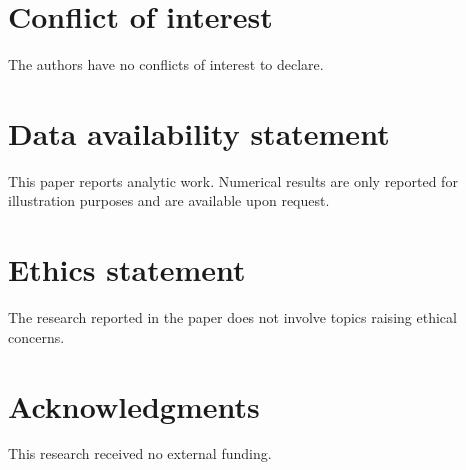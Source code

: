 \documentclass{article}
\theoremstyle{plain}
\theoremstyle{definition}
\theoremstyle{remark}
\begin{document}
\section{Conflict of interest}
The authors have no conflicts of interest to declare. 

\section{Data availability statement}
This paper reports analytic work. Numerical results are only
reported for illustration purposes and are available
upon request.

\section{Ethics statement}
The research reported in the paper does not involve topics
raising ethical concerns.

\section{Acknowledgments}
This research received no external funding.




\end{document}
